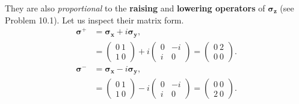 \documentclass{article}
\begin{document}
They are also \textit{proportional} to the \textbf{raising} and \textbf{lowering operators} of $\boldsymbol{\sigma_z}$
(see Problem 10.1). Let us inspect their matrix form.
\begin{align*}\label{eq 10.6}
    \boldsymbol{\sigma^+}&=\boldsymbol{\sigma_x}+i\boldsymbol{\sigma_y},\\
    &=\begin{pmatrix}
        0\ 1\\ 1\ 0
    \end{pmatrix}+i\begin{pmatrix}
        0& -i\\ i& 0
    \end{pmatrix}=
    \begin{pmatrix}
        0\ 2\\ 0\ 0
    \end{pmatrix}.\tag{10.6}
\end{align*}
\begin{align*}\label{eq 10.7}
    \boldsymbol{\sigma^-}&=\boldsymbol{\sigma_x}-i\boldsymbol{\sigma_y},\\
    &=\begin{pmatrix}
        0\ 1\\ 1\ 0
    \end{pmatrix}-i\begin{pmatrix}
        0& -i\\ i& 0
    \end{pmatrix}=
    \begin{pmatrix}
        0\ 0\\ 2\ 0
    \end{pmatrix}.\tag{10.7}
\end{align*}
\end{document}
